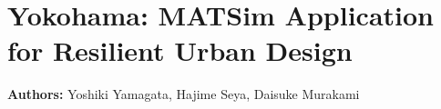\chapter{Yokohama: MATSim Application for Resilient Urban Design}
\label{ch:yokohama}
\hfill \textbf{Authors:} Yoshiki Yamagata, Hajime Seya, Daisuke Murakami

